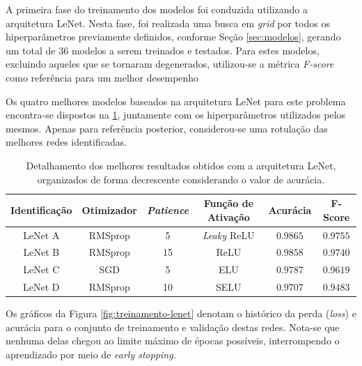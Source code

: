 A primeira fase do treinamento dos modelos foi conduzida utilizando a arquitetura LeNet. Nesta fase, foi realizada uma busca em \emph{grid} por todos os hiperparâmetros previamente definidos, conforme Seção \ref{sec:modelos}, gerando um total de $36$ modelos a serem treinados e testados. Para estes modelos, excluindo aqueles que se tornaram degenerados, utilizou-se a métrica \emph{F-score} como referência para um melhor desempenho

Os quatro melhores modelos baseados na arquitetura LeNet para este problema encontra-se dispostos na \ref{tab:lenet}, juntamente com os hiperparâmetros utilizados pelos mesmos. Apenas para referência posterior, considerou-se uma rotulação das melhores redes identificadas.

\begin{table}[h]
\centering
\caption{Detalhamento dos melhores resultados obtidos com a arquitetura LeNet, organizados de forma decrescente considerando o valor de acurácia.}
\label{tab:lenet}
\begin{tabular}{cccccc}
\toprule
\textbf{Identificação} & \textbf{Otimizador} & \textbf{\emph{Patience}}  & \textbf{Função de Ativação} & \textbf{Acurácia} & \textbf{F-Score} \\
\midrule
LeNet A & RMSprop & 5 & \emph{Leaky} ReLU & $0.9865$ & $0.9755$ \\
LeNet B & RMSprop & 15 & ReLU & $0.9858$ & $0.9740$\\
LeNet C & SGD & 5 & ELU & $0.9787$ & $0.9619$ \\
LeNet D & RMSprop & 10 & SELU & $0.9707$ & $0.9483$ \\
\bottomrule
\end{tabular}
\end{table}


Os gráficos da Figura \ref{fig:treinamento-lenet} denotam o histórico da perda (\emph{loss}) e acurácia para o conjunto de treinamento e validação destas redes. Nota-se que nenhuma delas chegou ao limite máximo de épocas possíveis, interrompendo o aprendizado por meio de \emph{early stopping}.

